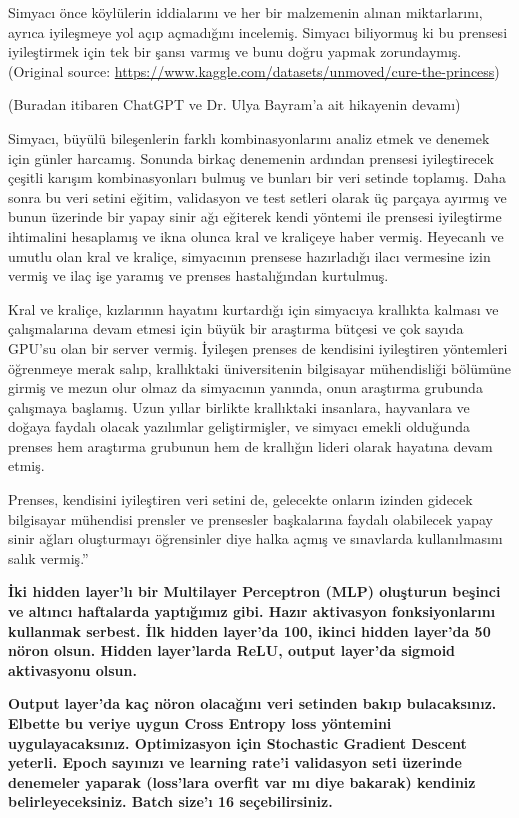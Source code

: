 \documentclass[11pt]{article}
\begin{document}
Simyacı önce köylülerin iddialarını ve her bir malzemenin alınan miktarlarını, ayrıca iyileşmeye yol açıp açmadığını incelemiş. Simyacı biliyormuş ki bu prensesi iyileştirmek için tek bir şansı varmış ve bunu doğru yapmak zorundaymış. (Original source: \url{https://www.kaggle.com/datasets/unmoved/cure-the-princess})

(Buradan itibaren ChatGPT ve Dr. Ulya Bayram'a ait hikayenin devamı)

Simyacı, büyülü bileşenlerin farklı kombinasyonlarını analiz etmek ve denemek için günler harcamış. Sonunda birkaç denemenin ardından prensesi iyileştirecek çeşitli karışım kombinasyonları bulmuş ve bunları bir veri setinde toplamış. Daha sonra bu veri setini eğitim, validasyon ve test setleri olarak üç parçaya ayırmış ve bunun üzerinde bir yapay sinir ağı eğiterek kendi yöntemi ile prensesi iyileştirme ihtimalini hesaplamış ve ikna olunca kral ve kraliçeye haber vermiş. Heyecanlı ve umutlu olan kral ve kraliçe, simyacının prensese hazırladığı ilacı vermesine izin vermiş ve ilaç işe yaramış ve prenses hastalığından kurtulmuş.

Kral ve kraliçe, kızlarının hayatını kurtardığı için simyacıya krallıkta kalması ve çalışmalarına devam etmesi için büyük bir araştırma bütçesi ve çok sayıda GPU'su olan bir server vermiş. İyileşen prenses de kendisini iyileştiren yöntemleri öğrenmeye merak salıp, krallıktaki üniversitenin bilgisayar mühendisliği bölümüne girmiş ve mezun olur olmaz da simyacının yanında, onun araştırma grubunda çalışmaya başlamış. Uzun yıllar birlikte krallıktaki insanlara, hayvanlara ve doğaya faydalı olacak yazılımlar geliştirmişler, ve simyacı emekli olduğunda prenses hem araştırma grubunun hem de krallığın lideri olarak hayatına devam etmiş.

Prenses, kendisini iyileştiren veri setini de, gelecekte onların izinden gidecek bilgisayar mühendisi prensler ve prensesler başkalarına faydalı olabilecek yapay sinir ağları oluşturmayı öğrensinler diye halka açmış ve sınavlarda kullanılmasını salık vermiş.''

\textbf{İki hidden layer'lı bir Multilayer Perceptron (MLP) oluşturun beşinci ve altıncı haftalarda yaptığımız gibi. Hazır aktivasyon fonksiyonlarını kullanmak serbest. İlk hidden layer'da 100, ikinci hidden layer'da 50 nöron olsun. Hidden layer'larda ReLU, output layer'da sigmoid aktivasyonu olsun.}

\textbf{Output layer'da kaç nöron olacağını veri setinden bakıp bulacaksınız. Elbette bu veriye uygun Cross Entropy loss yöntemini uygulayacaksınız. Optimizasyon için Stochastic Gradient Descent yeterli. Epoch sayınızı ve learning rate'i validasyon seti üzerinde denemeler yaparak (loss'lara overfit var mı diye bakarak) kendiniz belirleyeceksiniz. Batch size'ı 16 seçebilirsiniz.}
\end{document}
